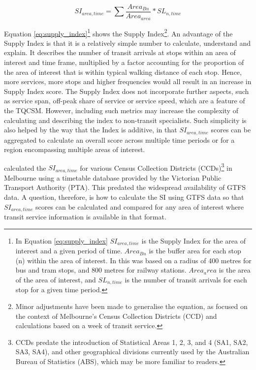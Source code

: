 \documentclass[]{tufte-book}
\begin{document}
\begin{marginfigure}
\begin{equation}
\label{eq:supply_index}
SI_{area, time} = \sum{\frac{Area_{Bn}}{Area_{area}}*SL_{n, time}}
\end{equation}
\end{marginfigure}

Equation \ref{eq:supply_index}\footnote{In Equation
  \ref{eq:supply_index} \(SI_{area, time}\) is the Supply Index for the
  area of interest and a given period of time. \(Area_{Bn}\) is the
  buffer area for each stop (n) within the area of interest. In
  \citet{currie2007identifying} this was based on a radius of 400 metres
  for bus and tram stops, and 800 metres for railway stations.
  \(Area_area\) is the area of the area of interest, and \(SL_{n,time}\)
  is the number of transit arrivals for each stop for a given time
  period.} shows the Supply Index\footnote{Minor adjustments have been
  made to generalise the equation, as \citet{currie2007identifying}
  focused on the context of Melbourne's Census Collection Districts
  (CCD) and calculations based on a week of transit service.}. An
advantage of the Supply Index is that it is a relatively simple number
to calculate, understand and explain. It describes the number of transit
arrivals at stops within an area of interest and time frame, multiplied
by a factor accounting for the proportion of the area of interest that
is within typical walking distance of each stop. Hence, more services,
more stops and higher frequencies would all result in an increase in
Supply Index score. The Supply Index does not incorporate further
aspects, such as service span, off-peak share of service or service
speed, which are a feature of the TQCSM. However, including such metrics
may increase the complexity of calculating and describing the index to
non-transit specialists. Such simplicity is also helped by the way that
the Index is additive, in that \(SI_{area, time}\) scores can be
aggregated to calculate an overall score across multiple time periods or
for a region encompassing multiple areas of interest.

\citet{currie2007identifying} calculated the \(SI_{area, time}\) for
various Census Collection Districts (CCDs)\footnote{CCDs predate the
  introduction of Statistical Areas 1, 2, 3, and 4 (SA1, SA2, SA3, SA4),
  and other geographical divisions currently used by the Australian
  Bureau of Statistics (ABS), which may be more familiar to readers.} in
Melbourne using a timetable database provided by the Victorian Public
Transport Authority (PTA). This predated the widespread availability of
GTFS data. A question, therefore, is how to calculate the SI using GTFS
data so that \(SI_{area, time}\) scores can be calculated and compared
for any area of interest where transit service information is available
in that format.
\end{document}
